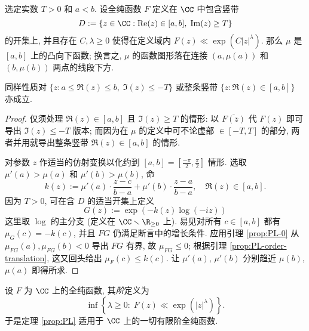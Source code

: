 \begin{theorem}\label{prop:PL} 
	选定实数 $T > 0$ 和 $a < b$. 设全纯函数 $F$ 定义在 $\CC$ 中包含竖带
	\[ D := \left\{ z \in \CC: \Re(z) \in [a,b], \; \Im(z) \geq T \right\} \]
	的开集上, 并且存在 $C, \lambda \geq 0$ 使得在定义域内 $F(z) \ll  \exp(C|z|^\lambda)$. 那么 $\mu$ 是 $[a,b]$ 上的凸向下函数; 
	换言之, $\mu$ 的函数图形落在连接 $(a, \mu(a))$ 和 $(b, \mu(b))$ 两点的线段下方.

	同样性质对 $\{ z : a \leq \Re(z) \leq b, \; \Im(z) \leq -T \}$ 或整条竖带 $\{z: \Re(z) \in [a,b] \}$ 亦成立.
\end{theorem}
\begin{proof}
	仅须处理 $\Re(z) \in [a,b]$ 且 $\Im(z) \geq T$ 的情形: 以 $\overline{F(\overline{z})}$ 代 $F(z)$ 即可导出 $\Im(z) \leq -T$ 版本; 而因为在 $\mu$ 的定义中可不论虚部 $\in [-T, T]$ 的部分, 两者并用就导出整条竖带 $\Re(z) \in [a,b]$ 的情形.

	对参数 $z$ 作适当的仿射变换以化约到 $[a, b] = [\frac{-\pi}{2}, \frac{\pi}{2}]$ 情形. 选取 $\mu'(a) > \mu(a)$ 和 $\mu'(b) > \mu(b)$, 命
	\[ k(z) := \mu'(a) \cdot \frac{z - c}{b - a} + \mu'(b) \cdot \frac{z - a}{b - a}, \quad \Re(z) \in [a,b]. \]
	因为 $T > 0$, 可在含 $D$ 的适当开集上定义
	\[ G(z) := \exp\left( -k(z) \log(-iz) \right) \]
	这里取 $\log$ 的主分支 (定义在 $\CC \smallsetminus \R_{\geq 0}$ 上). 易见对所有 $c \in [a,b]$ 都有 $\mu_G(c) = -k(c)$, 并且 $FG$ 仍满足断言中的增长条件. 应用引理 \ref{prop:PL-0} 从 $\mu_{FG}(a), \mu_{FG}(b) < 0$ 导出 $FG$ 有界, 故 $\mu_{FG} \leq 0$; 根据引理 \ref{prop:PL-order-translation}, 这又回头给出 $\mu_F(c) \leq k(c)$. 让 $\mu'(a)$, $\mu'(b)$ 分别趋近 $\mu(b)$, $\mu(a)$ 即得所求.
\end{proof}

设 $F$ 为 $\CC$ 上的全纯函数, 其\emph{阶}定义为 
\[ \inf\left\{ \lambda \geq 0: \; F(z) \ll \exp(|z|^\lambda) \right\}. \]
于是定理 \ref{prop:PL} 适用于 $\CC$ 上的一切有限阶全纯函数.
